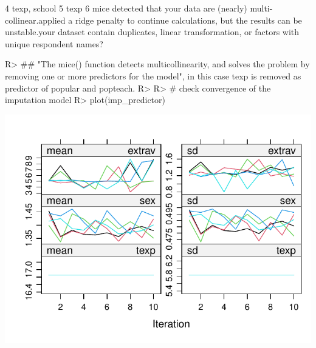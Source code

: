 \documentclass[
]{jss}
\begin{document}
\begin{CodeChunk}
\begin{CodeOutput}
4                                                                                                                                                                                                                                             texp, school
5                                                                                                                                                                                                                                                     texp
6 mice detected that your data are (nearly) multi-collinear.\nIt applied a ridge penalty to continue calculations, but the results can be unstable.\nDoes your dataset contain duplicates, linear transformation, or factors with unique respondent names?
\end{CodeOutput}
\begin{CodeInput}
R> ## "The mice() function detects multicollinearity, and solves the problem by removing one or more predictors for the model", in this case texp is removed as predictor of popular and popteach.
R> 
R> # check convergence of the imputation model
R> plot(imp_predictor)
\end{CodeInput}


\begin{center}\includegraphics{Manuscript_files/figure-latex/pop-predictor-1} \end{center}




\end{CodeChunk}
\end{document}
